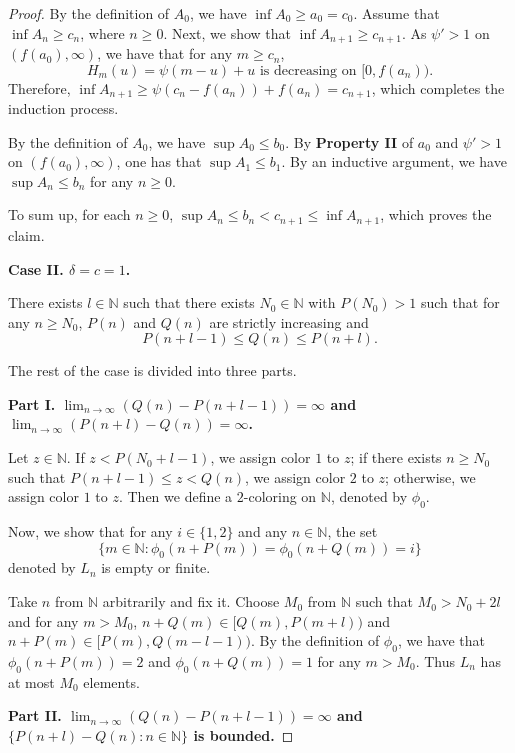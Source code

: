 \documentclass[reqno,12pt]{amsart}
\def \N {\mathbb N}
\numberwithin{equation}{section}
\begin{document}
\begin{proof}
By the definition of $A_0$, we have $\inf A_0\ge a_0=c_0$. Assume that $\inf A_n\ge c_n$, where $n\ge 0$. Next, we show that $\inf A_{n+1}\ge c_{n+1}$.
As $\psi'>1$ on $(f(a_0),\infty)$, we have that for any $m\ge c_n$,
\begin{equation*}\label{decreasing}H_{m}(u)=\psi(m-u)+u \text{ is decreasing on }[0,f(a_n)).
\end{equation*} Therefore, $\inf A_{n+1}\ge \psi(c_{n}-f(a_n))+f(a_n)=c_{n+1}$, which completes the induction process.

By the definition of $A_0$, we have $\sup A_0\le b_0$. By \textbf{Property II} of $a_0$ and $\psi'>1$ on $(f(a_0),\infty)$, one has that $\sup A_1\leq b_1$. By an inductive argument, we have $\sup A_n\leq b_n$ for any $n\ge 0$.




  To sum up, for each $n\ge 0$, $\sup A_n\leq b_n<c_{n+1}\leq \inf A_{n+1}$, which proves the claim.





	\noindent \textbf{Case II. $\delta=c=1$.}
	
	There exists $l\in \N$ such that there exists $N_0\in\N$ with $P(N_0)>1$ such that for any $n\ge N_0$, $P(n)$ and $Q(n)$ are strictly increasing and $$P(n+l-1)\le Q(n)\le P(n+l).$$
	
	The rest of the case is divided into three parts.
	
	\noindent\textbf{Part I. $\lim_{n\to\infty}(Q(n)-P(n+l-1))=\infty$ and $\lim_{n\to\infty}(P(n+l)-Q(n))=\infty$.}
	
	Let $z\in\N$. If $z<P(N_0+l-1)$, we assign color $1$ to $z$; if there exists $n\ge N_0$ such that $P(n+l-1)\le z<Q(n)$, we assign color $2$ to $z$; otherwise, we assign color $1$ to $z$. Then we define a $2$-coloring on $\N$, denoted by $\phi_0$.
	
Now, we show that for any $i\in \{1,2\}$ and any $n\in \N$, the set $$\{m\in \N:\phi_0(n+P(m))=\phi_0(n+Q(m))=i\}$$denoted by $L_n$ is empty or finite.

Take $n$ from $\N$ arbitrarily and fix it. Choose $M_0 $ from $\N$ such that $ M_0>N_0+2l$ and for any $m>M_0$, $n+Q(m)\in [Q(m),P(m+l)) $ and $n+P(m)\in [P(m),Q(m-l-1)) $. By the definition of $\phi_0$, we have that $\phi_0(n+P(m))=2 $ and $\phi_0(n+Q(m))=1$ for any $m>M_0$. Thus $L_n$ has at most $M_0$ elements.
	
	\noindent \textbf{Part II. $\lim_{n\to\infty}(Q(n)-P(n+l-1))=\infty$ and $\{P(n+l)-Q(n):n\in\N\}$ is bounded.}
	

\end{proof}
\end{document}
